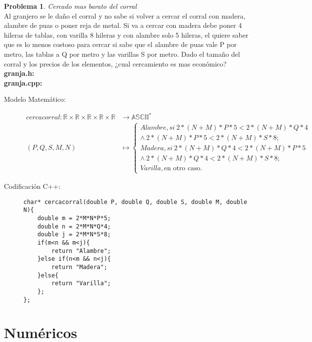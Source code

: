 \documentclass{article}
\theoremstyle{plain}
\theoremstyle{definition}
\newtheorem{problem}{Problema}
\begin{document}
\begin{problem} \emph{Cercado mas barato del corral}\\
Al granjero se le daño el corral y no sabe si volver a cercar el corral con madera,  alambre de puas o poner reja de metal. Si va a cercar con madera debe poner 4 hileras de tablas, con varilla 8 hileras y con alambre solo 5 hileras, el quiere saber que es lo menos costoso para cercar si sabe que el alambre de puas vale P por metro, las tablas a Q por metro y las varillas S por metro. Dado el tamaño del corral y los precios de los elementos, ¿cual cercamiento es mas económico?\\
\textbf{granja.h:}\ \\
\textbf{granja.cpp:}\ 
%
\begin{description}
\item[Modelo Matemático:]
%
\begin{align*}
cerca corral: \mathbb{R}\times\mathbb{R}\times\mathbb{R}\times\mathbb{R}\times\mathbb{R} &\to \mathbb{ASCII}^*\\
(P,Q,S,M,N) &\mapsto
\begin{cases}
Alambre, si\ 2*(N+M)*P*5< 2*(N+M)*Q*4\\ \wedge \ 2*(N+M)*P*5< 2*(N+M)*S*8;\\
Madera, si\ 2*(N+M)*Q*4< 2*(N+M)*P*5\\ \wedge \ 2*(N+M)*Q*4< 2*(N+M)*S*8;\\
Varilla, \text{en otro caso}.
\end{cases}
\end{align*}
%
\item[Codificación \textsf{C++}:]\hfill
%
\begin{verbatim}
char* cercacorral(double P, double Q, double S, double M, double N){
    double m = 2*M*N*P*5;
    double n = 2*M*N*Q*4;
    double j = 2*M*N*S*8;
    if(m<n && m<j){
        return "Alambre";
    }else if(n<m && n<j){
        return "Madera";
    }else{
        return "Varilla";
    };
};
\end{verbatim}
\end{description}
\end{problem}

\section{Numéricos}
\end{document}
